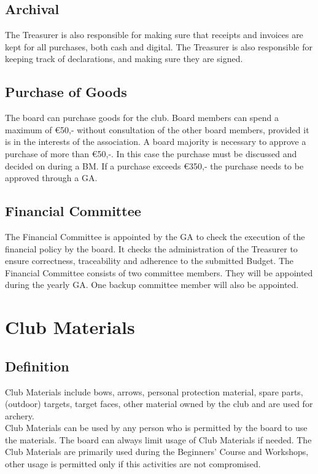 \documentclass[a4paper]{article}
\begin{document}
\subsection{Archival}
The Treasurer is also responsible for making sure that receipts and invoices are kept for all purchases, both cash and digital. The Treasurer is also responsible for keeping track of declarations, and making sure they are signed.

\subsection{Purchase of Goods}
The board can purchase goods for the club. Board members can spend a maximum of €50,- without consultation of the other board members, provided it is in the interests of the association. A board majority is necessary to approve a purchase of more than €50,-. In this case the purchase must be discussed and decided on during a BM. If a purchase exceeds €350,- the purchase needs to be approved through a GA.

\subsection{Financial Committee}
The Financial Committee is appointed by the GA to check the execution of the financial policy by the board. It checks the administration of the Treasurer to ensure correctness, traceability and adherence to the submitted Budget. The Financial Committee consists of two committee members. They will be appointed during the yearly GA. One backup committee member will also be appointed.

\section{Club Materials}
\subsection{Definition}
Club Materials include bows, arrows, personal protection material, spare parts, (outdoor) targets, target faces, other material owned by the club and are used for archery. \\

Club Materials can be used by any person who is permitted by the board to use the materials. The board can always limit usage of Club Materials if needed. The Club Materials are primarily used during the Beginners' Course and Workshops, other usage is permitted only if this activities are not compromised.
\end{document}
